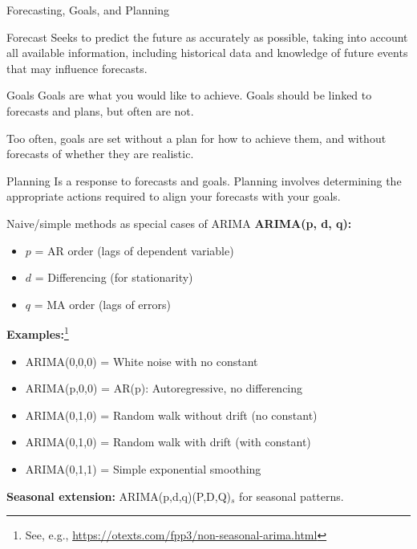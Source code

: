 \documentclass[11pt]{beamer}
\begin{document}
\begin{frame}{Forecasting, Goals, and Planning}
	\begin{block}{Forecast}
		Seeks to predict the future as accurately as possible, taking into account all available information, including historical data and knowledge of future events that may influence forecasts.
	\end{block}

	\begin{block}{Goals}
		Goals are what you would like to achieve. Goals should be linked to forecasts and plans, but often are not.

		Too often, goals are set without a plan for how to achieve them, and without forecasts of whether they are realistic.
	\end{block}

	\begin{block}{Planning}
		Is a response to forecasts and goals. Planning involves determining the appropriate actions required to align your forecasts with your goals.
	\end{block}
\end{frame}

\begin{frame}{Naive/simple methods as special cases of ARIMA}
	\textbf{ARIMA(p, d, q):}
	\begin{itemize}
		\item $p$ = AR order (lags of dependent variable)
		\item $d$ = Differencing (for stationarity)
		\item $q$ = MA order (lags of errors)
	\end{itemize}

	\vspace{0.15cm}
	\textbf{Examples:}\footnote{See, e.g., \url{https://otexts.com/fpp3/non-seasonal-arima.html}}
	\begin{itemize}
		\item ARIMA(0,0,0) = White noise with no constant
		\item ARIMA(p,0,0) = AR(p): Autoregressive, no differencing
		\item ARIMA(0,1,0) = Random walk without drift (no constant)
		\item ARIMA(0,1,0) = Random walk with drift (with constant)
		\item ARIMA(0,1,1) = Simple exponential smoothing
	\end{itemize}

	\vspace{0.1cm}
	\textbf{Seasonal extension:} ARIMA(p,d,q)(P,D,Q)$_s$ for seasonal patterns.
\end{frame}
\end{document}
